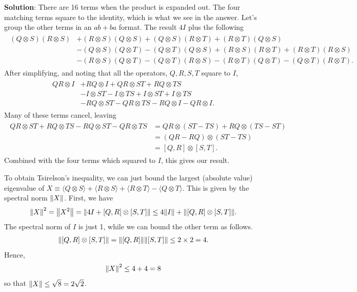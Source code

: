 \documentclass{book}
\begin{document}
    \textbf{Solution}: There are 16 terms when the product is expanded out. The four matching terms square to the identity, which is what we see in the answer. Let's group the other terms in an $ab + ba$ format. The result $4I$ plus the following
    \begin{align}
    \begin{aligned}
        (Q\otimes S) (R\otimes S) &+ (R\otimes S) (Q\otimes S) + (Q\otimes S)(R\otimes T) + (R\otimes T)(Q\otimes S) \\
        & -(Q\otimes S)(Q\otimes T) - (Q\otimes T)(Q\otimes S) + (R\otimes S)(R\otimes T) + (R\otimes T)(R\otimes S) \\
        & -(R\otimes S)(Q\otimes T) - (Q\otimes T)(R\otimes S) - (R\otimes T)(Q\otimes T) - (Q\otimes T)(R\otimes T).
    \end{aligned}
    \end{align}
    After simplifying, and noting that all the operators, $Q, R, S, T$ square to $I$,
    \begin{align}
    \begin{aligned}
        QR \otimes I &+ RQ \otimes I + QR \otimes ST + RQ \otimes TS \\
        &-I \otimes ST - I \otimes TS + I \otimes ST + I \otimes TS \\
        &-RQ \otimes ST - QR \otimes TS - RQ \otimes I - QR \otimes I.
    \end{aligned}
    \end{align}
    Many of these terms cancel, leaving
    \begin{align}
    \begin{aligned}
        QR \otimes ST + RQ \otimes TS - RQ \otimes ST - QR \otimes TS &= QR \otimes (ST - TS) + RQ \otimes (TS - ST)\\
        &= (QR - RQ) \otimes (ST - TS) \\
        &= [Q,R] \otimes [S,T].
    \end{aligned}
    \end{align}
    Combined with the four terms which squared to $I$, this gives our result.

    To obtain Tsirelson's inequality, we can just bound the largest (absolute value) eigenvalue of $X \equiv \langle Q \otimes S\rangle + \langle R \otimes S\rangle + \langle R \otimes T\rangle - \langle Q \otimes T\rangle$. This is given by the spectral norm $\norm{X}$. First, we have
    \begin{align}
        \norm{X}^2 = \norm{X^2} = \norm{4I + [Q,R] \otimes [S,T]} \leq 4 \norm{I} + \norm{[Q,R] \otimes [S,T]}.
    \end{align}
    The spectral norm of $I$ is just 1, while we can bound the other term as follows.
    \begin{align}
        \norm{[Q,R] \otimes [S,T]} = \norm{[Q,R]} \norm{[S,T]} \leq 2 \times 2 = 4.
    \end{align}
    Hence,
    \begin{align}
        \norm{X}^2 \leq 4 + 4 = 8
    \end{align}
    so that $\norm{X} \leq \sqrt{8} = 2 \sqrt{2}$.
\end{document}
